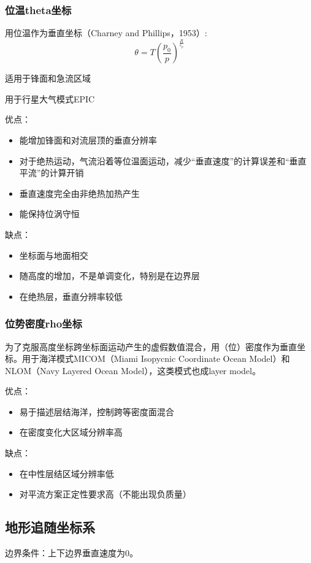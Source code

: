 \documentclass{article}
\begin{document}
\subsubsection{位温theta坐标}
用位温作为垂直坐标（Charney and Phillips，1953）:
$$\theta=T(\frac{p_0}{p})^{\frac{R}{c_p}}$$

适用于锋面和急流区域

用于行星大气模式EPIC

优点：
\begin{itemize}
    \item 能增加锋面和对流层顶的垂直分辨率
    \item 对于绝热运动，气流沿着等位温面运动，减少“垂直速度”的计算误差和“垂直平流”的计算开销
    \item 垂直速度完全由非绝热加热产生
    \item 能保持位涡守恒
\end{itemize}

缺点：
\begin{itemize}
    \item 坐标面与地面相交
    \item 随高度的增加，不是单调变化，特别是在边界层
    \item 在绝热层，垂直分辨率较低
\end{itemize}

\subsubsection{位势密度rho坐标}
为了克服高度坐标跨坐标面运动产生的虚假数值混合，用（位）密度作为垂直坐标。用于海洋模式MICOM（Miami Isopycnic Coordinate Ocean Model）和NLOM（Navy Layered Ocean Model），这类模式也成layer model。


优点：
\begin{itemize}
    \item 易于描述层结海洋，控制跨等密度面混合
    \item 在密度变化大区域分辨率高
\end{itemize}

缺点：
\begin{itemize}
    \item 在中性层结区域分辨率低
    \item 对平流方案正定性要求高（不能出现负质量）
\end{itemize}

\subsection{地形追随坐标系}
边界条件：上下边界垂直速度为0。
\end{document}
